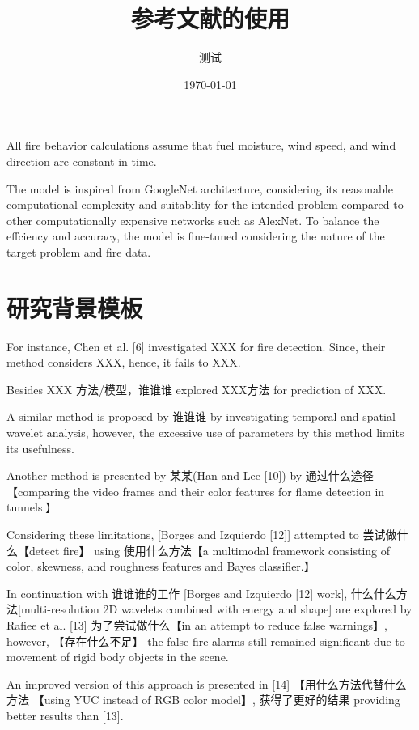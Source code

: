 \documentclass[UTF8]{ctexart}
\title{参考文献的使用}
\author{测试}
\date{\today}
\begin{document}
	    \maketitle
	    
	
		All fire behavior calculations assume that fuel moisture, wind speed,
		and wind direction are constant in time.\cite{finney_overview_2006}
		
		The model is inspired from GoogleNet architecture, considering its reasonable computational complexity and
		suitability for the intended problem compared to other computationally expensive networks such as AlexNet.
		To balance the effciency and accuracy, the model is fine-tuned considering the nature of the target problem
		and fire data.\cite{K.Muhammad_2018}
	    
		\section{研究背景模板}
		
		For instance,
		Chen et al. [6] investigated XXX for fire
		detection. Since, their method considers XXX, hence, it fails to XXX. 
		
		Besides XXX 方法/模型，谁谁谁 explored XXX方法 for prediction of XXX. 
		
		A similar method is proposed by 谁谁谁 by investigating temporal and spatial
		wavelet analysis, however, the excessive use of parameters by
		this method limits its usefulness.
		
		Another method is presented
		by 某某(Han and Lee [10]) by 通过什么途径【comparing the video frames and
		their color features for flame detection in tunnels.】 
	
		Considering these limitations, [Borges
		and Izquierdo [12]] attempted to 尝试做什么【detect fire】 using 使用什么方法【a multimodal
		framework consisting of color, skewness, and roughness features
		and Bayes classifier.】
		
		In continuation with 谁谁谁的工作 [Borges and Izquierdo [12] work],
		什么什么方法[multi-resolution 2D wavelets combined with energy and
		shape] are explored by Rafiee et al. [13]  为了尝试做什么【in an attempt to
		reduce false warnings】, however, 【存在什么不足】 the false fire alarms still
		remained significant due to movement of rigid body objects in
		the scene.
		
		An improved version of this approach is presented
		in [14] 【用什么方法代替什么方法 【using YUC instead of RGB color model】, 获得了更好的结果 providing
		better results than [13].
		
\end{document}
